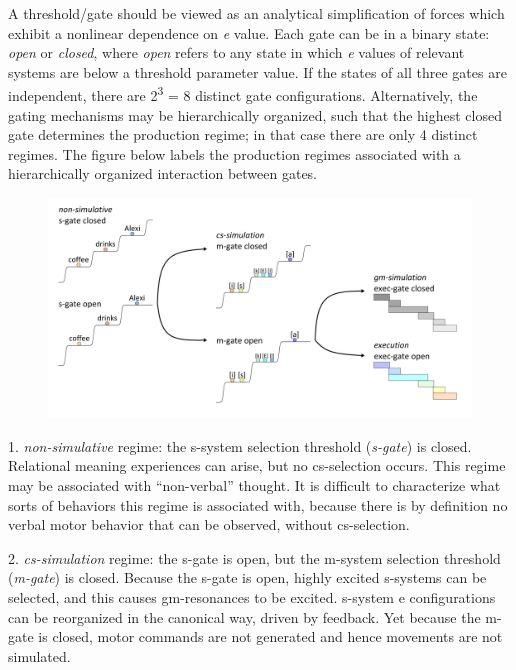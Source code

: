   A threshold/gate should be viewed as an analytical simplification of forces which exhibit a nonlinear dependence on \textit{e} value. Each gate can be in a binary state: \textit{open} or \textit{closed}, where \textit{open} refers to any state in which \textit{e} values of relevant systems are below a threshold parameter value. If the states of all three gates are independent, there are 2\textsuperscript{3} = 8 distinct gate configurations. Alternatively, the gating mechanisms may be hierarchically organized, such that the highest closed gate determines the production regime; in that case there are only 4 distinct regimes. The figure below labels the production regimes associated with a hierarchically organized interaction between gates.

  
\begin{figure}
\includegraphics[width=\textwidth]{figures/Tilsen-img56.png}
\caption{\missingcaption}
\label{fig:}
\end{figure}
 

1. \textit{non-simulative} regime: the s-system selection threshold (\textit{s-gate}) is closed. Relational meaning experiences can arise, but no cs-selection occurs. This regime may be associated with “non-verbal” thought. It is difficult to characterize what sorts of behaviors this regime is associated with, because there is by definition no verbal motor behavior that can be observed, without cs-selection. 

2. \textit{cs-simulation} regime: the s-gate is open, but the m-system selection threshold (\textit{m-gate}) is closed. Because the s-gate is open, highly excited s-systems can be selected, and this causes gm-resonances to be excited. s-system e configurations can be reorganized in the canonical way, driven by feedback. Yet because the m-gate is closed, motor commands are not generated and hence movements are not simulated. 


